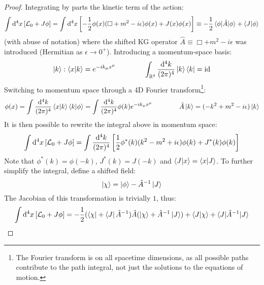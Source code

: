 \begin{proofbox}
  \begin{proof}
    Integrating by parts the kinetic term of the action:
    \begin{equation*}
      \int \mathrm{d}^4x \left[ \mathcal{L}_0 + J \phi \right] = \int \mathrm{d}^4x \left[ - \frac{1}{2} \phi(x) (\Box + m^2 - i\epsilon) \phi(x) + J(x) \phi(x) \right] \equiv - \frac{1}{2} \braket{\phi | \hat{A} | \phi} + \braket{J | \phi}
    \end{equation*}
    (with abuse of notation) where the shifted KG operator $ \hat{A} \equiv \Box + m^2 - i\epsilon $ was introduced (Hermitian as $ \epsilon \rightarrow 0^+ $). Introducing a momentum-space basis:
    \begin{equation}
      \ket{k} : \braket{x | k} = e^{-i k_\mu x^\mu}
      \qquad \qquad
      \int_{\mathbb{R}^4} \frac{\mathrm{d}^4k}{(2\pi)^4} \ket{k} \bra{k} = \operatorname{id}
    \end{equation}
    Switching to momentum space through a 4D Fourier transform\footnote{The Fourier transform is on all spacetime dimensions, as all possible paths contribute to the path integral, not just the solutions to the equations of motion.}:
    \begin{equation*}
      \phi(x) = \int \frac{\mathrm{d}^4k}{(2\pi)^4} \braket{x | k} \braket{k | \phi} = \int \frac{\mathrm{d}^4k}{(2\pi)^4} \phi(k) e^{-i k_\mu x^\mu}
      \qquad \qquad
      \hat{A} \ket{k} = (-k^2 + m^2 - i\epsilon) \ket{k}
    \end{equation*}
    It is then possible to rewrite the integral above in momentum space:
    \begin{equation*}
      \int \mathrm{d}^4x \left[ \mathcal{L}_0 + J \phi \right] = \int \frac{\mathrm{d}^4k}{(2\pi)^4} \left[ \frac{1}{2} \phi^*(k) (k^2 - m^2 + i\epsilon) \phi(k) + J^*(k) \phi(k) \right]
    \end{equation*}
    Note that $ \phi^*(k) = \phi(-k) $, $ J^*(k) = J(-k) $ and $ \braket{J|x} = \braket{x|J} $. To further simplify the integral, define a shifted field:
    \begin{equation*}
      \ket{\chi} = \ket{\phi} - \hat{A}^{-1} \ket{J}
    \end{equation*}
    The Jacobian of this transformation is trivially $ 1 $, thus:
    \begin{equation*}
      \begin{split}
        \int \dd^4x \left[ \lag_0 + J\phi \right]
        & = - \frac{1}{2} (\bra{\chi} + \bra{J} \hat{A}^{-1}) \hat{A} (\ket{\chi} + \hat{A}^{-1} \ket{J}) + \braket{J | \chi} + \braket{J | \hat{A}^{-1} | J} \\

\end{split}
\end{equation*}
\end{proof}
\end{proofbox}
